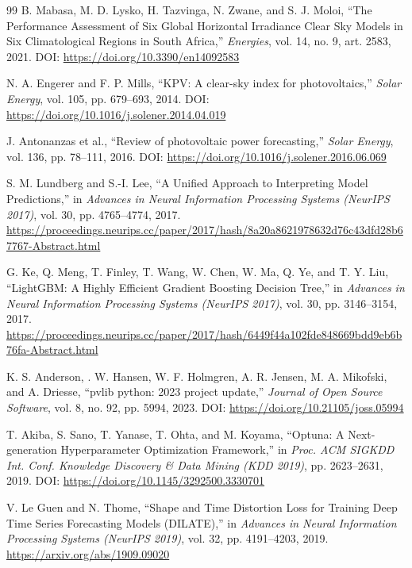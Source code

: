 \documentclass[12pt,a4paper]{article}
\begin{document}
\begin{thebibliography}{99}
B. Mabasa, M. D. Lysko, H. Tazvinga, N. Zwane, and S. J. Moloi,
``The Performance Assessment of Six Global Horizontal Irradiance Clear Sky Models in Six Climatological Regions in South Africa,''
\textit{Energies}, vol. 14, no. 9, art. 2583, 2021.
DOI: \url{https://doi.org/10.3390/en14092583}

N. A. Engerer and F. P. Mills,
``KPV: A clear-sky index for photovoltaics,''
\textit{Solar Energy}, vol. 105, pp. 679--693, 2014.
DOI: \url{https://doi.org/10.1016/j.solener.2014.04.019}

J. Antonanzas et al.,
``Review of photovoltaic power forecasting,''
\textit{Solar Energy}, vol. 136, pp. 78--111, 2016.
DOI: \url{https://doi.org/10.1016/j.solener.2016.06.069}

S. M. Lundberg and S.-I. Lee, 
``A Unified Approach to Interpreting Model Predictions,'' 
in \textit{Advances in Neural Information Processing Systems (NeurIPS 2017)}, vol. 30, pp. 4765--4774, 2017.
\url{https://proceedings.neurips.cc/paper/2017/hash/8a20a8621978632d76c43dfd28b67767-Abstract.html}

G. Ke, Q. Meng, T. Finley, T. Wang, W. Chen, W. Ma, Q. Ye, and T. Y. Liu, 
``LightGBM: A Highly Efficient Gradient Boosting Decision Tree,'' 
in \textit{Advances in Neural Information Processing Systems (NeurIPS 2017)}, vol. 30, pp. 3146--3154, 2017.
\url{https://proceedings.neurips.cc/paper/2017/hash/6449f44a102fde848669bdd9eb6b76fa-Abstract.html}

K. S. Anderson, . W. Hansen, W. F. Holmgren, A. R. Jensen, M. A. Mikofski, and A. Driesse,
``pvlib python: 2023 project update,''
\textit{Journal of Open Source Software}, vol. 8, no. 92, pp. 5994, 2023.
DOI: \url{https://doi.org/10.21105/joss.05994}

T. Akiba, S. Sano, T. Yanase, T. Ohta, and M. Koyama, 
``Optuna: A Next-generation Hyperparameter Optimization Framework,'' 
in \textit{Proc. ACM SIGKDD Int. Conf. Knowledge Discovery \& Data Mining (KDD 2019)}, pp. 2623--2631, 2019.
DOI: \url{https://doi.org/10.1145/3292500.3330701}

V. Le Guen and N. Thome,
``Shape and Time Distortion Loss for Training Deep Time Series Forecasting Models (DILATE),''
in \textit{Advances in Neural Information Processing Systems (NeurIPS 2019)}, vol. 32, pp. 4191--4203, 2019.
\url{https://arxiv.org/abs/1909.09020}


\end{thebibliography}
\end{document}
